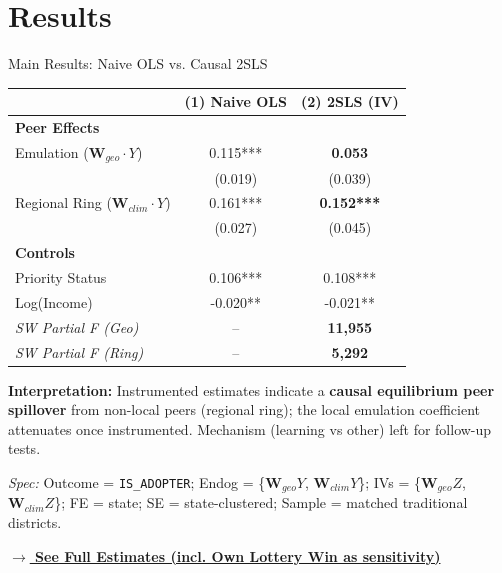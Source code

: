 \documentclass[10pt]{beamer}
\begin{document}
\section{Results}

\begin{frame}[label=main_results]{Main Results: Naive OLS vs. Causal 2SLS}
  \begin{table}
    \centering
    \small
    \begin{tabular}{l c c}
      \toprule
       & \textbf{(1) Naive OLS} & \textbf{(2) 2SLS (IV)} \\
      \midrule
      \textbf{Peer Effects} & & \\
      Emulation ($\mathbf{W}_{geo} \cdot Y$) & 0.115*** & \textbf{0.053} \\
       & (0.019) & (0.039) \\
      Regional Ring ($\mathbf{W}_{clim} \cdot Y$) & 0.161*** & \textbf{0.152***} \\
       & (0.027) & (0.045) \\
      \midrule
      \textbf{Controls} & & \\
      Priority Status & 0.106*** & 0.108*** \\
      Log(Income) & -0.020** & -0.021** \\
      \midrule
      \textit{SW Partial F (Geo)} & -- & \textbf{11,955} \\
      \textit{SW Partial F (Ring)} & -- & \textbf{5,292} \\
      \bottomrule
    \end{tabular}
  \end{table}

  \vspace{-0.5em}
  \textbf{Interpretation:} Instrumented estimates indicate a \textbf{causal equilibrium peer spillover} from non-local peers (regional ring); the local emulation coefficient attenuates once instrumented. Mechanism (learning vs other) left for follow-up tests.

  \vspace{0.4em}
  {\footnotesize \textit{Spec:} Outcome = \texttt{IS\_ADOPTER}; Endog = \{$\mathbf{W}_{geo}Y$, $\mathbf{W}_{clim}Y$\}; IVs = \{$\mathbf{W}_{geo}Z$, $\mathbf{W}_{clim}Z$\}; FE = state; SE = state-clustered; Sample = matched traditional districts.}

  \vspace{0.5em}
  \hyperlink{backup_peer_effects}{\textbf{\color{mLightBrown} $\rightarrow$ See Full Estimates (incl. Own Lottery Win as sensitivity)}}
\end{frame}
\end{document}
